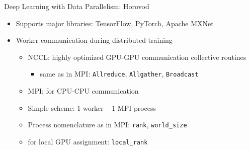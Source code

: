 \begin{frame}{Deep Learning with Data Parallelism: Horovod}
\protect\hypertarget{deep-learning-with-data-parallelism-horovod-1}{}

\begin{itemize}
\tightlist
\item
  Supports major libraries: TensorFlow, PyTorch, Apache MXNet
\item
  Worker communication during distributed training

  \begin{itemize}
  \tightlist
  \item
    NCCL: highly optimized GPU-GPU communication collective routines

    \begin{itemize}
    \tightlist
    \item
      same as in MPI: \texttt{Allreduce}, \texttt{Allgather},
      \texttt{Broadcast}
    \end{itemize}
  \item
    MPI: for CPU-CPU communication
  \item
    Simple scheme: 1 worker -- 1 MPI process
  \item
    Process nomenclature as in MPI: \texttt{rank}, \texttt{world\_size}
  \item
    for local GPU assignment: \texttt{local\_rank}
  \end{itemize}
\end{itemize}


\end{frame}

